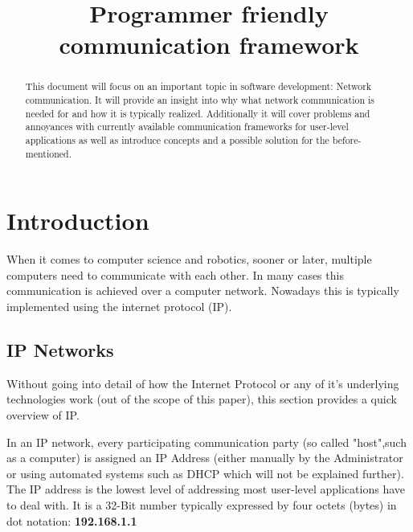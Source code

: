 \documentclass[conference]{IEEEtran}
\begin{document}
\title{Programmer friendly communication framework}

\author{
    \and
}

\maketitle

\begin{abstract}
    This document will focus on an important topic in software development: Network communication. It will provide an insight into why what network communication is needed for and how it is typically realized. Additionally it will cover problems and annoyances with currently available communication frameworks for user-level applications as well as introduce concepts and a possible solution for the before-mentioned. 
\end{abstract}

\section{Introduction}

When it comes to computer science and robotics, sooner or later, multiple computers need to communicate with each other. In many cases this communication is achieved over a computer network. Nowadays this is typically implemented using the internet protocol (IP).

\subsection{IP Networks}

Without going into detail of how the Internet Protocol or any of it's underlying technologies work (out of the scope of this paper), this section provides a quick overview of IP.

In an IP network, every participating communication party (so called "host",such as a computer) is assigned an IP Address (either manually by the Administrator or using automated systems such as DHCP which will not be explained further). The IP address is the lowest level of addressing most user-level applications have to deal with. It is a 32-Bit number typically expressed by four octets (bytes) in dot notation: \textbf{192.168.1.1}
\end{document}
